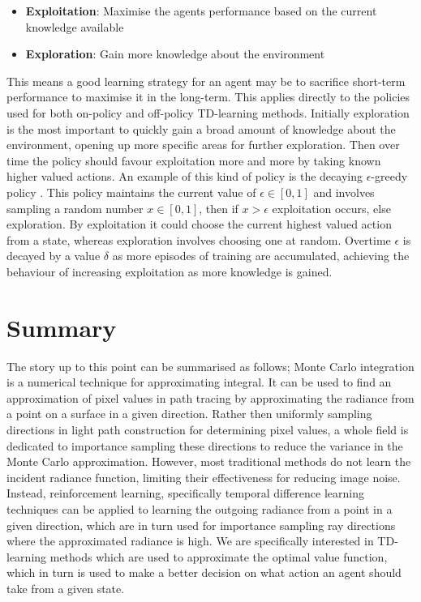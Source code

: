 \documentclass[../dissertation.tex]{subfiles}
\begin{document}
\begin{itemize}
\item \textbf{Exploitation}: Maximise the agents performance based on the current knowledge available
\item \textbf{Exploration}: Gain more knowledge about the environment
\end{itemize}

This means a good learning strategy for an agent may be to sacrifice short-term performance to maximise it in the long-term. This applies directly to the policies used for both on-policy and off-policy TD-learning methods. Initially exploration is the most important to quickly gain a broad amount of knowledge about the environment, opening up more specific areas for further exploration. Then over time the policy should favour exploitation more and more by taking known higher valued actions. An example of this kind of policy is the decaying $\epsilon$-greedy policy \cite{sutton2011reinforcement}. This policy maintains the current value of $\epsilon \in [0,1]$ and involves sampling a random number $x \in [0,1]$, then if $x > \epsilon$ exploitation occurs, else exploration. By exploitation it could choose the current highest valued action from a state, whereas exploration involves choosing one at random. Overtime $\epsilon$ is decayed by a value $\delta$ as more episodes of training are accumulated, achieving the behaviour of increasing exploitation as more knowledge is gained.

\section*{Summary}
The story up to this point can be summarised as follows; Monte Carlo integration is a numerical technique for approximating integral. It can be used to find an approximation of pixel values in path tracing by approximating the radiance from a point on a surface in a given direction. Rather then uniformly sampling directions in light path construction for determining pixel values, a whole field is dedicated to importance sampling these directions to reduce the variance in the Monte Carlo approximation. However, most traditional methods do not learn the incident radiance function, limiting their effectiveness for reducing image noise. Instead, reinforcement learning, specifically temporal difference learning techniques can be applied to learning the outgoing radiance from a point in a given direction, which are in turn used for importance sampling ray directions where the approximated radiance is high. We are specifically interested in TD-learning methods which are used to approximate the optimal value function, which in turn is used to make a better decision on what action an agent should take from a given state.
\end{document}
